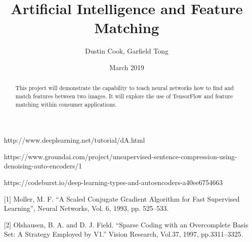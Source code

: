 \documentclass[notitlepage]{report}
\title{Artificial Intelligence and Feature Matching}
\author{Dustin Cook, Garfield Tong}
\date{March \nth{6} 2019}
\begin{document}
\maketitle
\thispagestyle{empty}

\begin{abstract}
This project will demonstrate the capability to teach neural networks how to find and match features between two images. It will explore the use of TensorFlow and feature matching within consumer applications. 
\end{abstract}

\begin{thebibliography}{9}

http://www.deeplearning.net/tutorial/dA.html

  https://www.groundai.com/project/unsupervised-sentence-compression-using-denoising-auto-encoders/1


https://codeburst.io/deep-learning-types-and-autoencoders-a40ee6754663

  [1] Moller, M. F. “A Scaled Conjugate Gradient Algorithm for Fast Supervised Learning”, Neural Networks, Vol. 6, 1993, pp. 525–533.


[2] Olshausen, B. A. and D. J. Field. “Sparse Coding with an Overcomplete Basis Set: A Strategy Employed by V1.” Vision Research, Vol.37, 1997, pp.3311–3325.


\end{thebibliography}
\end{document}
